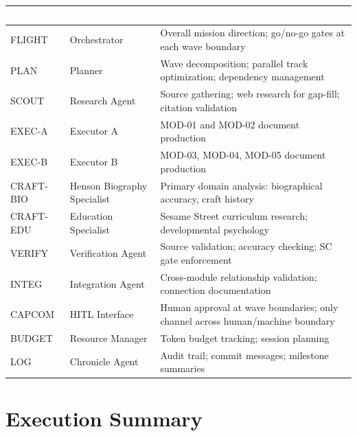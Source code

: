 \documentclass[11pt,letterpaper]{article}
\newcommand{\tableheader}[1]{\textbf{\sffamily\textcolor{white}{#1}}}
\begin{document}
\begin{center}
\begin{tabularx}{\textwidth}{L{2cm}L{3cm}X}
\toprule
{}
\tableheader{Role} & \tableheader{Agent} & \tableheader{Responsibility} \\
\midrule
FLIGHT & Orchestrator & Overall mission direction; go/no-go gates at each wave boundary \\
PLAN & Planner & Wave decomposition; parallel track optimization; dependency management \\
SCOUT & Research Agent & Source gathering; web research for gap-fill; citation validation \\
EXEC-A & Executor A & MOD-01 and MOD-02 document production \\
EXEC-B & Executor B & MOD-03, MOD-04, MOD-05 document production \\
CRAFT-BIO & Henson Biography Specialist & Primary domain analysis: biographical accuracy, craft history \\
CRAFT-EDU & Education Specialist & Sesame Street curriculum research; developmental psychology \\
VERIFY & Verification Agent & Source validation; accuracy checking; SC gate enforcement \\
INTEG & Integration Agent & Cross-module relationship validation; connection documentation \\
CAPCOM & HITL Interface & Human approval at wave boundaries; only channel across human/machine boundary \\
BUDGET & Resource Manager & Token budget tracking; session planning \\
LOG & Chronicle Agent & Audit trail; commit messages; milestone summaries \\
\bottomrule
\end{tabularx}
\end{center}

\section{Execution Summary}
\end{document}
